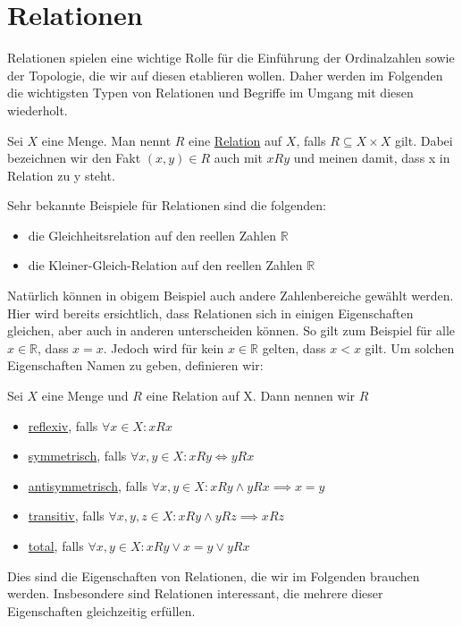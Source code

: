 \documentclass[11pt]{scrartcl}
\newcommand{\R}{\mathbb{R}}
\begin{document}
\section{Relationen}
Relationen spielen eine wichtige Rolle für die Einführung der Ordinalzahlen sowie der Topologie, die wir auf diesen etablieren wollen. Daher werden im Folgenden die wichtigsten Typen von Relationen und Begriffe
im Umgang mit diesen wiederholt.
\begin{definition}
	Sei $X$ eine Menge. Man nennt $R$ eine \underline{Relation} auf $X$, falls $R \subseteq X \times X$ gilt. Dabei bezeichnen wir den Fakt $(x,y)\in R$ auch mit $xRy$ und meinen damit, dass x in Relation zu y steht.
\end{definition}
\begin{example}
	Sehr bekannte Beispiele für Relationen sind die folgenden:
	\begin{itemize}
		\item die Gleichheitsrelation auf den reellen Zahlen $\R$
		\item die Kleiner-Gleich-Relation auf den reellen Zahlen $\R$
	\end{itemize}
\end{example}
Natürlich können in obigem Beispiel auch andere Zahlenbereiche gewählt werden. Hier wird bereits ersichtlich, dass Relationen sich in einigen Eigenschaften gleichen, aber auch in anderen unterscheiden können. So gilt zum Beispiel für alle $x\in\R$, dass $x=x$. Jedoch wird für kein $x\in\R$ gelten, dass $x<x$ gilt. Um solchen Eigenschaften Namen zu geben, definieren wir:
\begin{definition}
	Sei $X$ eine Menge und $R$ eine Relation auf X. Dann nennen wir $R$
	\begin{itemize}
		\item \underline{reflexiv}, falls $\forall x\in X: xRx$
		\item \underline{symmetrisch}, falls $\forall x,y\in X: xRy \iff yRx$
		\item \underline{antisymmetrisch}, falls $\forall x,y\in X: xRy \land yRx \implies x=y$
		\item \underline{transitiv}, falls $\forall x,y,z\in X: xRy \land yRz\implies xRz$
		\item \underline{total}, falls $\forall  x,y\in X: xRy \lor x=y \lor yRx$
	\end{itemize}
\end{definition}
\noindent Dies sind die Eigenschaften von Relationen, die wir im Folgenden brauchen werden. Insbesondere sind Relationen interessant, die mehrere dieser Eigenschaften gleichzeitig erfüllen.
\end{document}

